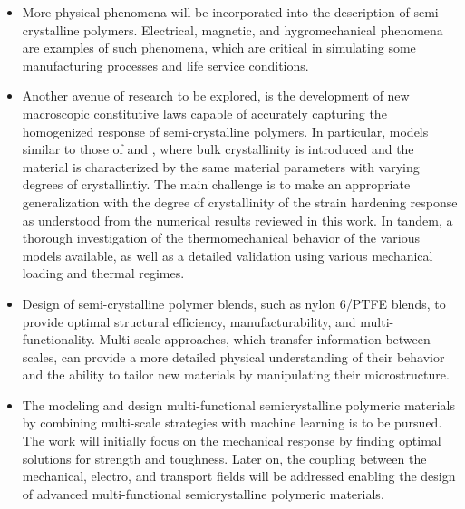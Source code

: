 \begin{itemize}
  \item More physical phenomena will be incorporated into the description of semi-crystalline polymers.
  Electrical, magnetic, and hygromechanical phenomena are examples of such phenomena, which are critical in simulating some manufacturing processes and life service conditions.
  \item Another avenue of research to be explored, is the development of new macroscopic constitutive laws capable of accurately capturing the homogenized response of semi-crystalline polymers.
  In particular, models similar to those of \cite{abdul-hameedTwophaseHyperelasticviscoplasticConstitutive2014} and \cite{ayoubEffectsCrystalContent2011}, where bulk crystallinity is introduced and the material is characterized by the same material parameters with varying degrees of crystallintiy.
  The main challenge is to make an appropriate generalization with the degree of crystallinity of the strain hardening response as understood from the numerical results reviewed in this work.
  In tandem, a thorough investigation of the thermomechanical behavior of the various models available, as well as a detailed validation using various mechanical loading and thermal regimes.
  \item Design of semi-crystalline polymer blends, such as nylon 6/PTFE blends, to provide optimal structural efficiency, manufacturability, and multi-functionality.
  Multi-scale approaches, which transfer information between scales, can provide a more detailed physical understanding of their behavior and the ability to tailor new materials by manipulating their microstructure.
  \item  The modeling and design multi-functional semicrystalline polymeric materials by combining multi-scale strategies with machine learning is to be pursued.
  The work will initially focus on the mechanical response by finding optimal solutions for strength and toughness.
  Later on, the coupling between the mechanical, electro, and transport fields will be addressed enabling the design of advanced multi-functional semicrystalline polymeric materials.

\end{itemize}
